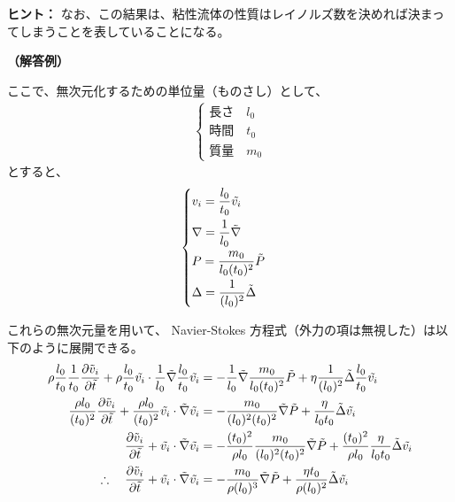 \documentclass[uplatex,dvipdfmx,a4paper,11pt]{jsarticle}
\newcommand{\difp}[2]{\dfrac{\partial #1}{\partial #2}}
\begin{document}
\begin{enumerate}
\begin{itembox}[l]{{\bf ヒント：}}
なお、この結果は、粘性流体の性質はレイノルズ数を決めれば決まってしまうことを表していることになる。

\end{itembox}

\vspace{10pt}
{\bf （解答例）}

ここで、無次元化するための単位量（ものさし）として、
\begin{align*}
\begin{cases}
\text{長さ} \quad l_0 \\
\text{時間} \quad t_0 \\
\text{質量} \quad m_0 
\end{cases}
\end{align*}
とすると、
\begin{equation*}
\begin{cases}
v_i = \dfrac{l_0}{t_0} \tilde{v_i} \notag \\[8pt]
\nabla = \dfrac{1}{l_0} \tilde{\nabla} \notag \\[8pt]
P = \dfrac{m_0}{l_0 (t_0)^2} \tilde{P} \notag \\[8pt]
\Delta = \dfrac{1}{(l_0)^2} \tilde{\Delta}
\end{cases}
\end{equation*}

これらの無次元量を用いて、 Navier-Stokes 方程式（外力の項は無視した）は以下のように展開できる。
\begin{align*}
\rho \dfrac{l_0}{t_0} \dfrac{1}{t_0} \dfrac{\partial \tilde{v}_i}{\partial \tilde{t}} + \rho \dfrac{l_0}{t_0} \tilde{v_i} \cdot \dfrac{1}{l_0} \tilde{\nabla} \dfrac{l_0}{t_0} \tilde{v_i} &= - \dfrac{1}{l_0} \tilde{\nabla} \dfrac{m_0}{l_0 (t_0)^2} \tilde{P} + \eta \dfrac{1}{(l_0)^2} \tilde{\Delta} \dfrac{l_0}{t_0} \tilde{v_i} \notag \\
\dfrac{\rho l_0}{(t_0)^2} \dfrac{\partial \tilde{v}_i}{\partial \tilde{t}} + \dfrac{\rho l_0}{(t_0)^2} \tilde{v_i} \cdot \tilde{\nabla} \tilde{v_i} &= - \dfrac{m_0}{(l_0)^2 (t_0)^2} \tilde{\nabla} \tilde{P} + \dfrac{\eta}{l_0 t_0} \tilde{\Delta} \tilde{v_i} \notag \\
\difp{\tilde{v}_i}{\tilde{t}} + \tilde{v_i} \cdot \tilde{\nabla} \tilde{v_i} &= - \dfrac{(t_0)^2}{\rho l_0} \dfrac{m_0}{(l_0)^2 (t_0)^2} \tilde{\nabla} \tilde{P} + \dfrac{(t_0)^2}{\rho l_0} \dfrac{\eta}{l_0 t_0} \tilde{\Delta} \tilde{v_i} \notag \\
\therefore \quad \difp{\tilde{v}_i}{\tilde{t}} + \tilde{v_i} \cdot \tilde{\nabla} \tilde{v_i} &= - \dfrac{m_0}{\rho (l_0)^3} \tilde{\nabla} \tilde{P} + \dfrac{\eta t_0}{\rho (l_0)^2} \tilde{\Delta} \tilde{v_i}
\end{align*}


\end{enumerate}
\end{document}
